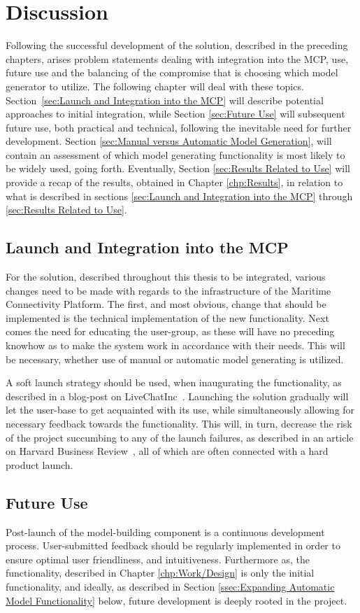 \chapter{Discussion}
Following the successful development of the solution, described in the preceding chapters, arises problem statements dealing with integration into the MCP, use, future use and the balancing of the compromise that is choosing which model generator to utilize. The following chapter will deal with these topics. Section \ref{sec:Launch and Integration into the MCP} will describe potential approaches to initial integration, while Section \ref{sec:Future Use} will subsequent future use, both practical and technical, following the inevitable need for further development. Section \ref{sec:Manual versus Automatic Model Generation}, will contain an assessment of which model generating functionality is most likely to be widely used, going forth. Eventually, Section \ref{sec:Results Related to Use} will provide a recap of the results, obtained in Chapter \ref{chp:Results}, in relation to what is described in sections \ref{sec:Launch and Integration into the MCP} through \ref{sec:Results Related to Use}.

\section{Launch and Integration into the MCP}
For the solution, described throughout this thesis to be integrated, various changes need to be made with regards to the infrastructure of the Maritime Connectivity Platform. The first, and most obvious, change that should be implemented is the technical implementation of the new functionality. Next comes the need for educating the user-group, as these will have no preceding knowhow as to make the system work in accordance with their needs. This will be necessary, whether use of manual or automatic model generating is utilized.

A soft launch strategy should be used, when inaugurating the functionality, as described in a blog-post on LiveChatInc~\cite{hardoSoft}. Launching the solution gradually will let the user-base to get acquainted with its use, while simultaneously allowing for necessary feedback towards the functionality. This will, in turn, decrease the risk of the project succumbing to any of the launch failures, as described in an article on Harvard Business Review~\cite{hbr}, all of which are often connected with a hard product launch.
\section{Future Use}
Post-launch of the model-building component is a continuous development process. User-submitted feedback should be regularly implemented in order to ensure optimal user friendliness, and intuitiveness. Furthermore as, the functionality, described in Chapter \ref{chp:Work/Design} is only the initial functionality, and ideally, as described in Section \ref{ssec:Expanding Automatic Model Functionality} below, future development is deeply rooted in the project.

